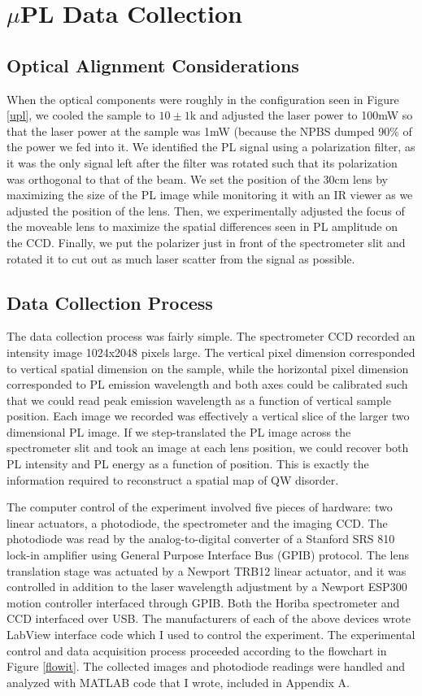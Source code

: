 \section{$\mu$PL Data Collection}
\subsection{Optical Alignment Considerations}
\indent When the optical components were roughly in the configuration seen in Figure \ref{upl}, we cooled the sample to $10\pm1$k and adjusted the laser power to 100mW so that the laser power at the sample was 1mW (because the NPBS dumped 90\% of the power we fed into it. We identified the PL signal using a polarization filter, as it was the only signal left after the filter was rotated such that its polarization was orthogonal to that of the beam. We set the position of the 30cm lens by maximizing the size of the PL image while monitoring it with an IR viewer as we adjusted the position of the lens. Then, we experimentally adjusted the focus of the moveable lens to maximize the spatial differences seen in PL amplitude on the CCD. Finally, we put the polarizer just in front of the spectrometer slit and rotated it to cut out as much laser scatter from the signal as possible.

\subsection{Data Collection Process}
\indent The data collection process was fairly simple. The spectrometer CCD recorded an intensity image 1024x2048 pixels large. The vertical pixel dimension corresponded to vertical spatial dimension on the sample, while the horizontal pixel dimension corresponded to PL emission wavelength and both axes could be calibrated such that we could read peak emission wavelength as a function of vertical sample position. Each image we recorded was effectively a vertical slice of the larger two dimensional PL image. If we step-translated the PL image across the spectrometer slit and took an image at each lens position, we could recover both PL intensity and PL energy as a function of position. This is exactly the information required to reconstruct a spatial map of QW disorder. 

\indent The computer control of the experiment involved five pieces of hardware: two linear actuators, a photodiode, the spectrometer and the imaging CCD. The photodiode was read by the analog-to-digital converter of a Stanford SRS 810 lock-in amplifier using General Purpose Interface Bus (GPIB) protocol. The lens translation stage was actuated by a Newport TRB12 linear actuator, and it was controlled in addition to the laser wavelength adjustment by a Newport ESP300 motion controller interfaced through GPIB. Both the Horiba spectrometer and CCD interfaced over USB. The manufacturers of each of the above devices wrote LabView interface code which I used to control the experiment. The experimental control and data acquisition process proceeded according to the flowchart in Figure \ref{flowit}. The collected images and photodiode readings were handled and analyzed with MATLAB code that I wrote, included in Appendix A.




